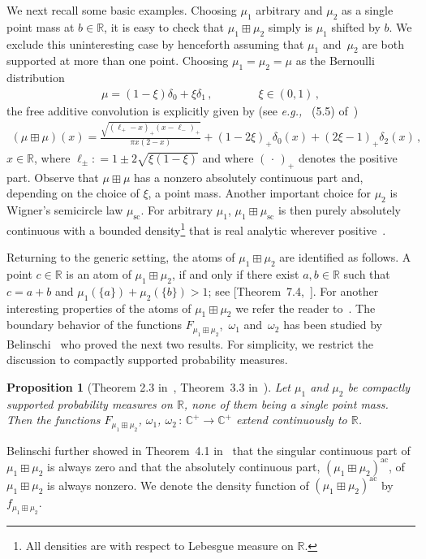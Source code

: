 \documentclass[10pt,reqno]{amsart}
\numberwithin{equation}{section}
\theoremstyle{plain}
\newtheorem{proposition}[theorem]{Proposition}
\numberwithin{kevin}{section}
\theoremstyle{remark}
\newcommand{\R}{{\mathbb R }}
\newcommand{\C}{{\mathbb C}}
\newcommand{\deq}{\mathrel{\mathop:}=}
\newcommand{\eg}{\emph{e.g., }}
\begin{document}
We next recall some basic examples. Choosing $\mu_1$ arbitrary and $\mu_2$ as a single point mass at $b\in \R$, it is easy to check that $\mu_{1}\boxplus\mu_2 $ simply is $\mu_1$ shifted by $b$. We exclude this uninteresting case by henceforth assuming that $\mu_1$ and~$\mu_2$ are both supported at more than one point. Choosing $\mu_1=\mu_2=\mu$ as the Bernoulli distribution
\begin{align*}
 \mu=(1-\xi)\delta_{0}+\xi \delta_{1}\,,\qquad\qquad \xi\in(0,1)\,,
\end{align*}
the free additive convolution is explicitly given by (see \eg~(5.5) of~\cite{VP})
\begin{align}\label{prototype of two point mass}
 (\mu\boxplus\mu)(x)=\frac{\sqrt{(\ell_+-x)_+(x-\ell_-)_+}}{\pi x(2-x)}+(1-2\xi)_+\delta_{0}(x)+(2\xi-1)_+\delta_2(x)\,,
\end{align}
$x\in\R$, where $\ell_\pm\deq 1\pm 2\sqrt{\xi(1-\xi)}$ and where $(\,\cdot\,)_+$ denotes the positive part. Observe that $\mu\boxplus\mu$ has a nonzero absolutely continuous part and, depending on the choice of $\xi$, a point mass. Another important choice for $\mu_2$ is Wigner's semicircle law $\mu_{\mathrm{sc}}$. For arbitrary $\mu_1$, $\mu_1\boxplus\mu_{\mathrm{sc}}$ is then purely absolutely continuous with a bounded density\footnote{All densities are with respect to Lebesgue measure on $\R$.}  that is real analytic wherever positive~\cite{B}. 

Returning to the generic setting, the atoms of $\mu_1\boxplus\mu_2$ are identified as follows.  A point $c\in\R$ is an atom of $\mu_1\boxplus\mu_2$, if and only if there exist $a,b\in\R$ such that $c=a+b$ and $\mu_1(\{a\})+\mu_2(\{b\})>1$; see [Theorem~7.4,~\cite{BeV98}]. For another interesting properties of the atoms of $\mu_1\boxplus\mu_2$ we refer the reader to~\cite{BW}. The boundary behavior of the functions $F_{\mu_1\boxplus\mu_2}$,~$\omega_1$ and~$\omega_2$ has been studied by Belinschi~\cite{Bel1,Bel,Bel2} who proved the next two results. For simplicity, we restrict the discussion to compactly supported probability measures.
\begin{proposition}[Theorem 2.3 in~\cite{Bel1}, Theorem~3.3 in~\cite{Bel}]\label{prop extension}
 Let $\mu_1$ and $\mu_2$ be compactly supported probability measures on $\R$, none of them being a single point mass. Then the functions $F_{\mu_1\boxplus\mu_2}$, $\omega_1$, $\omega_2\,:\, \C^+\to\C^+$ extend continuously to $\R$.
\end{proposition}
Belinschi further showed in Theorem~4.1 in~\cite{Bel} that the singular continuous part of $\mu_1\boxplus\mu_2$ is always zero and that the absolutely continuous part, $(\mu_1\boxplus\mu_2)^{\mathrm{ac}}$, of $\mu_1\boxplus\mu_2$ is always nonzero. We denote the density function of $(\mu_1\boxplus\mu_2)^{\mathrm{ac}}$ by $f_{\mu_1\boxplus\mu_2}$.
\end{document}
